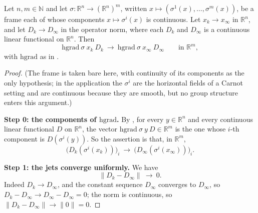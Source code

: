 \begin{lemma}
Let $n,m\in\mathbb N$ and let
$\sigma:\mathbb R^{n}\to(\mathbb R^{n})^{m}$, written $x\mapsto(\sigma^{1}(x),\ldots,
\sigma^{m}(x))$, be a frame each of whose components $x\mapsto\sigma^{i}(x)$ is continuous.
Let $x_k\to x_\infty$ in $\mathbb R^{n}$, and let $D_k\to D_\infty$ in the operator norm,
where each $D_k$ and $D_\infty$ is a continuous linear functional on $\mathbb R^{n}$. Then
\[
 \mathrm{hgrad}\ \sigma\ x_k\ D_k\ \longrightarrow\
 \mathrm{hgrad}\ \sigma\ x_\infty\ D_\infty \qquad\text{in }\mathbb R^{m},
\]
with $\mathrm{hgrad}$ as in .
\end{lemma}
\begin{proof}
(The frame is taken bare here, with continuity of its components as the only hypothesis;
in the application the $\sigma^{i}$ are the horizontal fields of a Carnot setting and are
continuous because they are smooth, but no group structure enters this argument.)

\medskip\noindent\textbf{Step 0: the components of $\mathrm{hgrad}$.} By ,
for every $y\in\mathbb R^{n}$ and every continuous linear functional $D$ on $\mathbb R^{n}$,
the vector $\mathrm{hgrad}\ \sigma\ y\ D\in\mathbb R^{m}$ is the one whose $i$-th component
is $D(\sigma^{i}(y))$. So the assertion is that, in $\mathbb R^{m}$,
\[
 \big(D_k(\sigma^{i}(x_k))\big)_{i}\ \longrightarrow\
 \big(D_\infty(\sigma^{i}(x_\infty))\big)_{i} . \tag{1}
\]

\medskip\noindent\textbf{Step 1: the jets converge uniformly.} We have
\[
 \|D_k-D_\infty\|\ \longrightarrow\ 0 . \tag{2}
\]
Indeed $D_k\to D_\infty$, and the constant sequence $D_\infty$ converges to $D_\infty$, so
$D_k-D_\infty\to D_\infty-D_\infty=0$; the norm is continuous, so
$\|D_k-D_\infty\|\to\|0\|=0$.


\end{proof}
